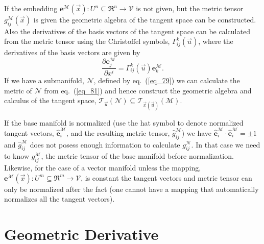 \documentclass[12pt,twoside,openright]{memoir}
\newcommand{\bm}[1]{\boldsymbol{#1}}
\newcommand{\bfrac}[2]{\displaystyle\frac{#1}{#2}}
\newcommand{\lp}{\left (}
\newcommand{\rp}{\right )}
\newcommand{\pdiff}[2]{\bfrac{\partial {#1}}{\partial {#2}}}
\newcommand{\f}[2]{{#1}\lp {#2} \rp}
\newcommand{\be}{\begin{equation}}
\newcommand{\ee}{\end{equation}}
\newcommand{\Tn}[2]{\f{\mathcal{T}_{#2}}{#1}}
\begin{document}
If the embedding $\f{\bm{e}^{\mathcal{M}}}{\vec{x}}\colon U^{n}\subseteq\Re^{n}\rightarrow \mathcal{V}$ is not given,
but the metric tensor $\f{g_{ij}^{\mathcal{M}}}{\vec{x}}$ is given the geometric algebra of the 
tangent space can be constructed.  Also the derivatives of the basis vectors of the tangent space can
be calculated from the metric tensor using the Christoffel symbols, $\f{\Gamma_{ij}^{k}}{\vec{u}}$, where the derivatives of the basis vectors are given by
\be
	\pdiff{\bm{e}_{j}^{\mathcal{M}}}{x^{i}} =\f{\Gamma_{ij}^{k}}{\vec{u}}\bm{e}_{k}^{\mathcal{M}}.
\ee 
If we have a submanifold, $\mathcal{N}$, defined by eq.~(\ref{eq_79}) we can calculate the metric of
$\mathcal{N}$ from eq.~(\ref{eq_81}) and hence construct the geometric algebra and calculus of the 
tangent space, $\Tn{\mathcal{N}}{\vec{u}}\subseteq \Tn{\mathcal{M}}{\f{\vec{x}}{\vec{u}}}$.

If the base manifold is normalized (use the hat symbol to denote normalized tangent vectors, 
 $\hat{\bm{e}}_{i}^{\mathcal{M}}$, and the resulting metric tensor, $\hat{g}_{ij}^{\mathcal{M}}$) we have
$\hat{\bm{e}}_{i}^{\mathcal{M}}\cdot\hat{\bm{e}}_{i}^{\mathcal{M}} = \pm 1$ and $\hat{g}_{ij}^{\mathcal{M}}$ does not posess enough
information to calculate $g_{ij}^{\mathcal{N}}$.  In that case we need to know $g_{ij}^{\mathcal{M}}$, the
metric tensor of the base manifold before normalization.  Likewise, for the case of a vector
manifold unless the mapping, $\f{\bm{e}^{\mathcal{M}}}{\vec{x}}\colon U^{m}\subseteq\Re^{m}\rightarrow \mathcal{V}$, is 
constant the tangent vectors and metric tensor can only be normalized after the fact (one cannot have a
mapping that automatically normalizes all the tangent vectors).

\section{Geometric Derivative}
\end{document}
